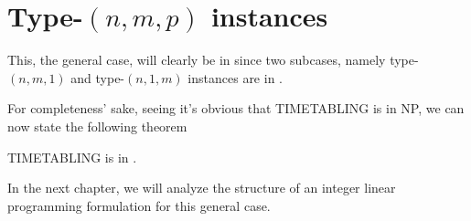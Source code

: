 \section{Type-$(n, m, p)$ instances}

This, the general case, will clearly be in \nph since two subcases, namely type-$(n, m, 1)$ and type-$(n, 1, m)$ instances are in \nph.

For completeness' sake, seeing it's obvious that TIMETABLING is in NP, we can now state the following theorem

\begin{thm}
TIMETABLING is in \npc.
\end{thm}

In the next chapter, we will analyze the structure of an integer linear programming formulation for this general case.
